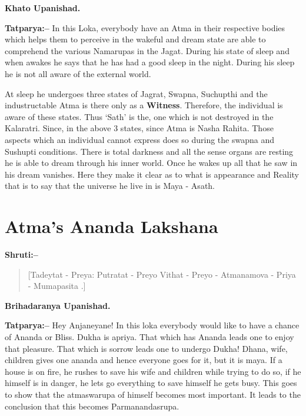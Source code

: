 \begin{flushright}
\textbf{Khato Upanishad.}
\end{flushright}

\textbf{Tatparya:–} In this Loka, everybody have an Atma in their respective bodies which helps them to perceive in the wakeful and dream state are able to comprehend the various Namarupas in the Jagat. During his state of sleep and when awakes he says that he has had a good sleep in the night. During his sleep he is not all aware of the external world.

At sleep he undergoes three states of Jagrat, Swapna, Suchupthi and the industructable Atma is there only as a \textbf{Witness}. Therefore, the individual is aware of these states. Thus ‘Sath’ is the, one which is not destroyed in the Kalaratri. Since, in the above 3 states, since Atma is Nasha Rahita. Those aspects which an individual cannot express does so during the swapna and Sushupti conditions. There is total darkness and all the sense organs are resting he is able to dream through his inner world. Once he wakes up all that he saw in his dream vanishes. Here they make it clear as to what is appearance and Reality that is to say that the universe he live in is Maya - Asath.

\chapter{Atma's Ananda Lakshana}

\textbf{Shruti:–}

\begin{verse}
[Tadeytat - Preya: Putratat - Preyo Vithat - Preyo - Atmanamova - Priya - Mumapasita .]
\end{verse}

\begin{flushright}
\textbf{Brihadaranya Upanishad.}
\end{flushright}

\textbf{Tatparya:–} Hey Anjaneyane! In this loka everybody would like to have a chance of Ananda or Bliss. Dukha is apriya. That which has Ananda leads one to enjoy that pleasure. That which is sorrow leads one to undergo Dukha! Dhana, wife, children gives one ananda and hence everyone goes for it, but it is maya. If a house is on fire, he rushes to save his wife and children while trying to do so, if he himself is in danger, he lets go everything to save himself he gets busy. This goes to show that the atmaswarupa of himself becomes most important. It leads to the conclusion that this becomes Parmanandasrupa.

